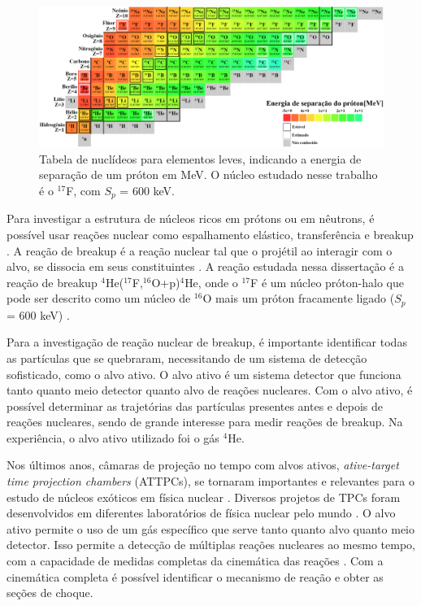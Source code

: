 \documentclass[a4paper,12pt,oneside]{book}
\begin{document}
\begin{figure}[H]
    \centering
    \includegraphics[scale = 0.25]{figs/chart_nuclides.png}
    \caption{Tabela de nuclídeos para elementos leves, indicando a energia de separação de um próton em MeV. O núcleo estudado nesse trabalho é o $^{17}$F, com $S_p$ = 600 keV. \cite{colourful_nuclide_chat}}
    \label{fig:chart_nuclides}
\end{figure}

\par Para investigar a estrutura de núcleos ricos em prótons ou em nêutrons, é possível usar reações nuclear como espalhamento elástico, transferência e breakup \cite{Kolata2016}. A reação de breakup é a reação nuclear tal que o projétil ao interagir com o alvo, se dissocia em seus constituintes \cite{Kolata2016, MORO_BREAKUP}. A reação estudada nessa dissertação é a reação de breakup $^4$He($^{17}$F,$^{16}$O+p)$^4$He, onde o $^{17}$F é um núcleo próton-halo que pode ser descrito como um núcleo de $^{16}$O mais um próton fracamente ligado ($S_p$ = 600 keV) \cite{MORO_BREAKUP}.

\par Para a investigação de reação nuclear de breakup, é importante identificar todas as partículas que se quebraram, necessitando de um sistema de detecção sofisticado, como o alvo ativo. O alvo ativo é um sistema detector que funciona tanto quanto meio detector quanto alvo de reações nucleares. Com o alvo ativo, é possível determinar as trajetórias das partículas presentes antes e depois de reações nucleares, sendo de grande interesse para medir reações de breakup. Na experiência, o alvo ativo utilizado foi o gás $^4$He.

\par Nos últimos anos, câmaras de projeção no tempo com alvos ativos, \textit{ative-target time projection chambers} (ATTPCs), se tornaram importantes e relevantes para o estudo de núcleos exóticos em física nuclear \cite{FORTINO2022166497}. Diversos projetos de TPCs foram desenvolvidos em diferentes laboratórios de física nuclear pelo mundo \cite{attpc, FURUNO2018215, KOSHCHIY2020163398}. O alvo ativo permite o uso de um gás específico que serve tanto quanto alvo quanto meio detector. Isso permite a detecção de múltiplas reações nucleares ao mesmo tempo, com a capacidade de medidas completas da cinemática das reações \cite{FORTINO2022166497, josh_bradt, attpc}. Com a cinemática completa é possível identificar o mecanismo de reação e obter as seções de choque.
\end{document}
